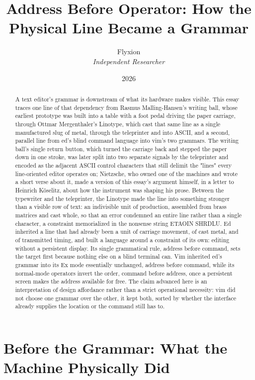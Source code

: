 \documentclass[11pt]{article}
\title{\textbf{Address Before Operator: How the Physical Line Became a Grammar}}
\author{Flyxion \\ \textit{Independent Researcher}}
\date{2026}
\begin{document}
\maketitle

\begin{abstract}
\noindent A text editor's grammar is downstream of what its hardware makes visible. This essay traces one line of that dependency from Rasmus Malling-Hansen's writing ball, whose earliest prototype was built into a table with a foot pedal driving the paper carriage, through Ottmar Mergenthaler's Linotype, which cast that same line as a single manufactured slug of metal, through the teleprinter and into ASCII, and a second, parallel line from ed's blind command language into vim's two grammars. The writing ball's single return button, which turned the carriage back and stepped the paper down in one stroke, was later split into two separate signals by the teleprinter and encoded as the adjacent ASCII control characters that still delimit the "lines" every line-oriented editor operates on; Nietzsche, who owned one of the machines and wrote a short verse about it, made a version of this essay's argument himself, in a letter to Heinrich Köselitz, about how the instrument was shaping his prose. Between the typewriter and the teleprinter, the Linotype made the line into something stronger than a visible row of text: an indivisible unit of production, assembled from brass matrices and cast whole, so that an error condemned an entire line rather than a single character, a constraint memorialized in the nonsense string ETAOIN SHRDLU. Ed inherited a line that had already been a unit of carriage movement, of cast metal, and of transmitted timing, and built a language around a constraint of its own: editing without a persistent display. Its single grammatical rule, address before command, sets the target first because nothing else on a blind terminal can. Vim inherited ed's grammar into its Ex mode essentially unchanged, address before command, while its normal-mode operators invert the order, command before address, once a persistent screen makes the address available for free. The claim advanced here is an interpretation of design affordance rather than a strict operational necessity: vim did not choose one grammar over the other, it kept both, sorted by whether the interface already supplies the location or the command still has to.
\end{abstract}

\section{Before the Grammar: What the Machine Physically Did}
\end{document}
